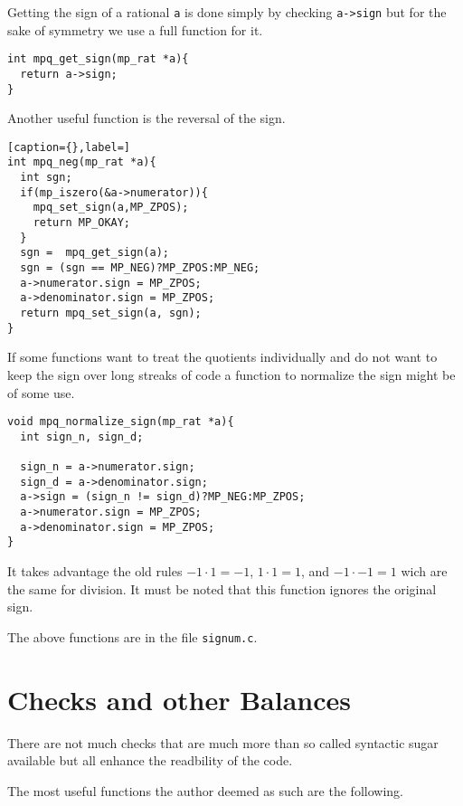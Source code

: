 \documentclass[10pt]{book}
\newcommand{\code}[1]{{\texttt{#1}}}
\theoremstyle{definition}
\theoremstyle{remark}
\begin{document}
Getting the sign of a rational \lstinline!a! is done simply by
checking \lstinline!a->sign! but for the sake of symmetry we use a full function
for it.
 \begin{center}
    \begin{lstlisting}[caption={Get Sign of Rational},label=getsignrat]
int mpq_get_sign(mp_rat *a){
  return a->sign;
}
    \end{lstlisting}
  \end{center}
Another useful function is the reversal of the sign.
 \begin{center}
    \begin{lstlisting}[caption={},label=]
int mpq_neg(mp_rat *a){
  int sgn;
  if(mp_iszero(&a->numerator)){
    mpq_set_sign(a,MP_ZPOS);
    return MP_OKAY;
  }
  sgn =  mpq_get_sign(a);
  sgn = (sgn == MP_NEG)?MP_ZPOS:MP_NEG;
  a->numerator.sign = MP_ZPOS;
  a->denominator.sign = MP_ZPOS;
  return mpq_set_sign(a, sgn);
}
    \end{lstlisting}
  \end{center}
If some functions want to treat the quotients individually and do not want to
keep the sign over long streaks of code a function to normalize the sign might
be of some use.
 \begin{center}
    \begin{lstlisting}[caption={Nomalize Sign},label=normsign]
void mpq_normalize_sign(mp_rat *a){
  int sign_n, sign_d;
  
  sign_n = a->numerator.sign;
  sign_d = a->denominator.sign;
  a->sign = (sign_n != sign_d)?MP_NEG:MP_ZPOS;
  a->numerator.sign = MP_ZPOS;
  a->denominator.sign = MP_ZPOS;
}
    \end{lstlisting}
  \end{center}
It takes advantage the old rules $-1\cdot 1= -1$, $1\cdot 1=1$, and
$-1\cdot -1= 1$ wich are the same for division. It must be noted that this
function ignores the original sign.

The above functions are in the file \code{signum.c}.
\chapter{Checks and other Balances}
There are not much checks that are much more than so called syntactic sugar
available but all enhance the readbility of the code.

The most useful functions the author deemed as such are the following.
\end{document}
